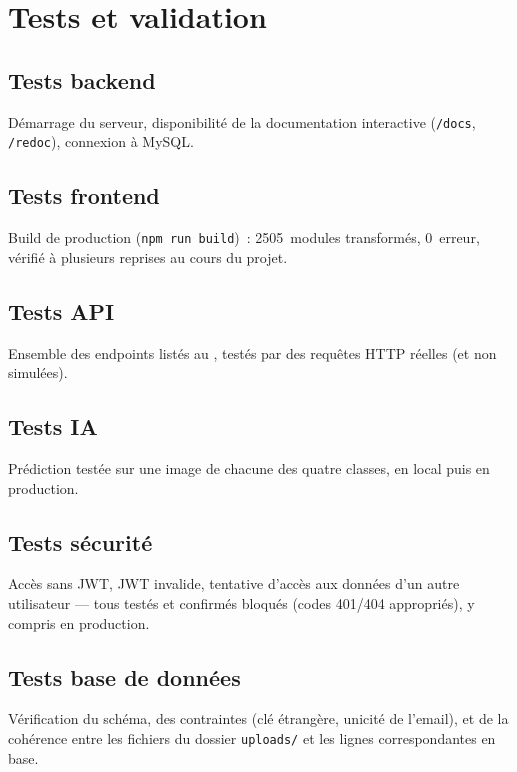 \chapter{Tests et validation}
\label{ch:tests}

\section{Tests backend}

D\'emarrage du serveur, disponibilit\'e de la documentation interactive (\texttt{/docs}, \texttt{/redoc}), connexion \`a MySQL.

\section{Tests frontend}

Build de production (\texttt{npm run build})~: 2505~modules transform\'es, 0~erreur, v\'erifi\'e \`a plusieurs reprises au cours du projet.

\section{Tests API}

Ensemble des endpoints list\'es au , test\'es par des requ\^etes HTTP r\'eelles (et non simul\'ees).

\section{Tests IA}

Pr\'ediction test\'ee sur une image de chacune des quatre classes, en local puis en production.

\section{Tests s\'ecurit\'e}

Acc\`es sans JWT, JWT invalide, tentative d'acc\`es aux donn\'ees d'un autre utilisateur --- tous test\'es et confirm\'es bloqu\'es (codes 401/404 appropri\'es), y compris en production.

\section{Tests base de donn\'ees}

V\'erification du sch\'ema, des contraintes (cl\'e \'etrang\`ere, unicit\'e de l'email), et de la coh\'erence entre les fichiers du dossier \texttt{uploads/} et les lignes correspondantes en base.


